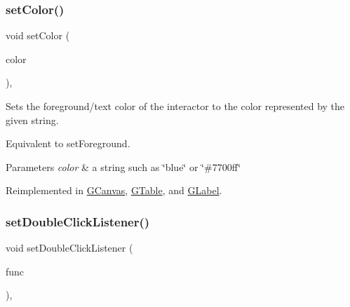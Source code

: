 \mbox{\label{classGInteractor_a61374df6c11b52cfbb0815decdbaebc6}} 
\subsubsection{\texorpdfstring{set\+Color()}{setColor()}\hspace{0.1cm}{\footnotesize\ttfamily [2/2]}}
{\footnotesize\ttfamily void set\+Color (\begin{DoxyParamCaption}\item[{const std\+::string \&}]{color }\end{DoxyParamCaption})\hspace{0.3cm}{\ttfamily [virtual]}, {\ttfamily [inherited]}}



Sets the foreground/text color of the interactor to the color represented by the given string. 

Equivalent to set\+Foreground. 
\begin{DoxyParams}{Parameters}
{\em color} & a string such as \char`\"{}blue\char`\"{} or \char`\"{}\#7700ff\char`\"{} \\
\hline
\end{DoxyParams}


Reimplemented in \mbox{\hyperlink{classGCanvas_a56845b1accc47aa881d05939eef6996c}{G\+Canvas}}, \mbox{\hyperlink{classGTable_a56845b1accc47aa881d05939eef6996c}{G\+Table}}, and \mbox{\hyperlink{classGLabel_a56845b1accc47aa881d05939eef6996c}{G\+Label}}.

\mbox{\label{classGInteractor_ac29f9a3462458e165fae3a1f046ee77a}} 
\subsubsection{\texorpdfstring{set\+Double\+Click\+Listener()}{setDoubleClickListener()}\hspace{0.1cm}{\footnotesize\ttfamily [1/2]}}
{\footnotesize\ttfamily void set\+Double\+Click\+Listener (\begin{DoxyParamCaption}\item[{G\+Event\+Listener}]{func }\end{DoxyParamCaption})\hspace{0.3cm}{\ttfamily [virtual]}, {\ttfamily [inherited]}}



